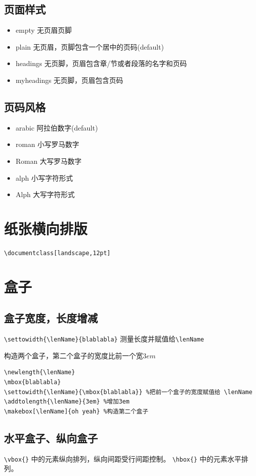 \documentclass[a4paper,11pt]{article}
\begin{document}
\subsection{页面样式}
\begin{itemize}
	\item empty 无页眉页脚
	\item plain 无页眉，页脚包含一个居中的页码(default)
	\item headings 无页脚，页眉包含章/节或者段落的名字和页码
	\item myheadings 无页脚，页眉包含页码
\end{itemize}

\subsection{页码风格}
\begin{itemize}
	\item arabic 阿拉伯数字(default)
	\item roman 小写罗马数字
	\item Roman 大写罗马数字
	\item alph 小写字符形式
	\item Alph 大写字符形式
\end{itemize}
 

\section{纸张横向排版}
\verb+\documentclass[landscape,12pt]+

\section{盒子}
\subsection{盒子宽度，长度增减}
\verb+\settowidth{\lenName}{blablabla}+ 测量长度并赋值给\verb+\lenName+

构造两个盒子，第二个盒子的宽度比前一个宽$3em$
\begin{Verbatim}
\newlength{\lenName}
\mbox{blablabla}
\settowidth{\lenName}{\mbox{blablabla}} %把前一个盒子的宽度赋值给 \lenName
\addtolength{\lenName}{3em} %增加3em
\makebox[\lenName]{oh yeah} %构造第二个盒子
\end{Verbatim}

\subsection{水平盒子、纵向盒子}
\verb+\vbox{}+ 中的元素纵向排列，纵向间距受行间距控制。
\verb+\hbox{}+ 中的元素水平排列。
\end{document}
